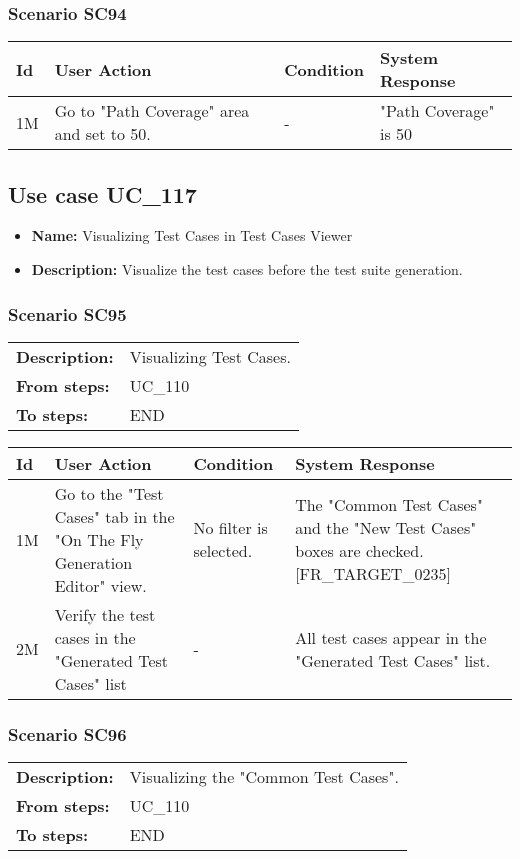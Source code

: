 \documentclass[a4paper,11pt]{article}
\newcommand{\bl}{\\ \hline}
\begin{document}
\subsubsection*{Scenario SC94}
 
\begin{tabular}{|p{0.8in}|p{1.6in}|p{1.6in}|p{1.6in}|}
\hline
Id & User Action & Condition & System Response  \bl 
1M & Go to "Path Coverage" area and set to 50.  & - & "Path Coverage" is 50%
\end{tabular}
\subsection*{Use case UC_117}
\begin{itemize}
\item {\bf Name: }Visualizing Test Cases in Test Cases Viewer
\item {\bf Description: }Visualize the test cases before the test suite
				generation.
\end{itemize}
\subsubsection*{Scenario SC95}
\begin{tabular}{p{1in}p{4in}}
{\bf Description:} & Visualizing Test Cases. \\
{\bf From steps:} & UC_110#2M \\
{\bf To steps:} & END \\
\end{tabular}
 
\begin{tabular}{|p{0.8in}|p{1.6in}|p{1.6in}|p{1.6in}|}
\hline
Id & User Action & Condition & System Response  \bl 
1M & Go to the "Test Cases" tab in the "On The Fly Generation
						Editor" view. & No filter is selected. & The "Common Test Cases" and the "New Test Cases" boxes
						are checked. [FR_TARGET_0235]  \bl 
2M & Verify the test cases in the "Generated Test Cases" list
					 & - & All test cases appear in the "Generated Test Cases" list.
					 \bl 
\end{tabular}
\subsubsection*{Scenario SC96}
\begin{tabular}{p{1in}p{4in}}
{\bf Description:} & Visualizing the "Common Test Cases". \\
{\bf From steps:} & UC_110#2M \\
{\bf To steps:} & END \\
\end{tabular}
 
\end{document}
